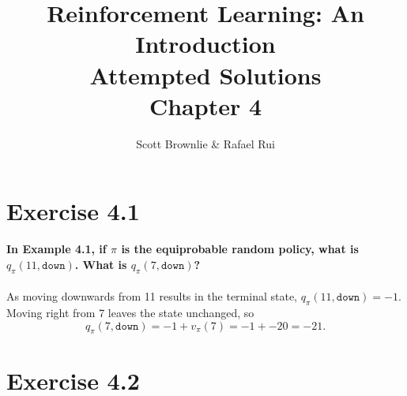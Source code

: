 \documentclass[a4paper,11pt]{article}
\title{Reinforcement Learning: An Introduction \\ Attempted Solutions \\ Chapter 4}
\author{Scott Brownlie \& Rafael Rui}
\date{}
\numberwithin{equation}{section}
\theoremstyle{remark}
\begin{document}
\maketitle

\section{Exercise 4.1}

\textbf{In Example 4.1, if $\pi$ is the equiprobable random policy, what is $q_\pi(11, \texttt{down})$. What is $q_\pi(7, \texttt{down})$?}
\\ \\
As moving downwards from 11 results in the terminal state, $q_\pi(11, \texttt{down}) = -1$. Moving right from 7 leaves the state unchanged, so 
\[
	q_\pi(7, \texttt{down}) = -1 + v_\pi(7) = -1 + -20 = -21.
\]

\section{Exercise 4.2}
\end{document}
